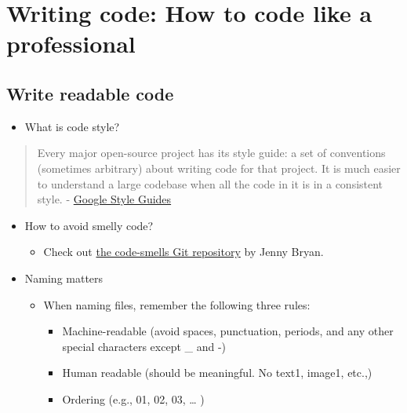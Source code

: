 \documentclass[
]{book}
\providecommand{\tightlist}{%
  \setlength{\itemsep}{0pt}\setlength{\parskip}{0pt}}
\begin{document}
\hypertarget{writing-code-how-to-code-like-a-professional}{%
\section{Writing code: How to code like a professional}\label{writing-code-how-to-code-like-a-professional}}

\hypertarget{write-readable-code}{%
\subsection{Write readable code}\label{write-readable-code}}

\begin{itemize}
\tightlist
\item
  What is code style?
\end{itemize}

\begin{quote}
Every major open-source project has its style guide: a set of conventions (sometimes arbitrary) about writing code for that project. It is much easier to understand a large codebase when all the code in it is in a consistent style. - \href{https://google.GitHub.io/styleguide/}{Google Style Guides}
\end{quote}

\begin{itemize}
\item
  How to avoid smelly code?

  \begin{itemize}
  \tightlist
  \item
    Check out \href{https://GitHub.com/jennybc/code-smells-and-feels\#readme}{the code-smells Git repository} by Jenny Bryan.
  \end{itemize}
\end{itemize}

\begin{itemize}
\item
  Naming matters

  \begin{itemize}
  \tightlist
  \item
    When naming files, remember the following three rules:

    \begin{itemize}
    \tightlist
    \item
      Machine-readable (avoid spaces, punctuation, periods, and any other special characters except \_ and -)
    \item
      Human readable (should be meaningful. No text1, image1, etc.,)
    \item
      Ordering (e.g., 01, 02, 03, \ldots{} )
    \end{itemize}
  \end{itemize}
\end{itemize}
\end{document}
